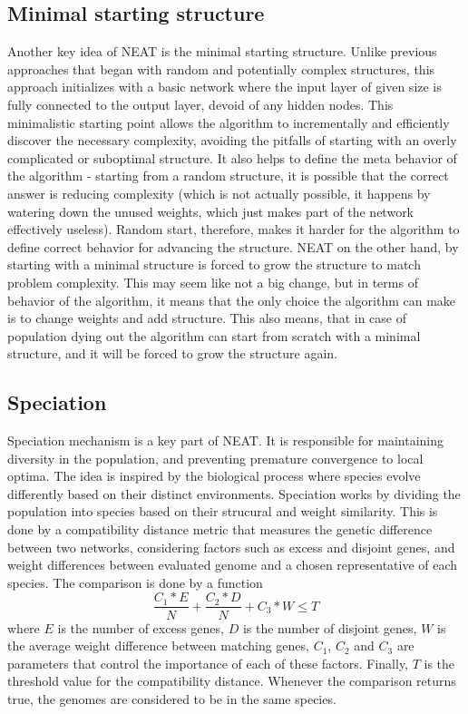 \documentclass{article}
\begin{document}
\subsection{Minimal starting structure}
Another key idea of NEAT is the minimal starting structure. Unlike previous approaches that began with random and potentially complex structures, 
this approach initializes with a basic network where the input layer of given size is fully connected to the output layer, devoid of any hidden nodes.
This minimalistic starting point allows the algorithm to incrementally and efficiently discover the necessary complexity, avoiding the pitfalls of starting
with an overly complicated or suboptimal structure. It also helps to define the meta behavior of the algorithm - starting from a random structure, it is
possible that the correct answer is reducing complexity (which is not actually possible, it happens by watering down the unused weights, which just makes
part of the network effectively useless). Random start, therefore, makes it harder for the algorithm to define correct behavior for advancing the structure.
NEAT on the other hand, by starting with a minimal structure is forced to grow the structure to match problem complexity. This may seem like not a big
change, but in terms of behavior of the algorithm, it means that the only choice the algorithm can make is to change weights and add structure. This also means,
that in case of population dying out the algorithm can start from scratch with a minimal structure, and it will be forced to grow the structure again. 

\subsection{Speciation}
Speciation mechanism is a key part of NEAT.
It is responsible for maintaining diversity in the population, and preventing premature convergence to local optima.
The idea is inspired by the biological process where species evolve differently based on their distinct environments.
Speciation works by dividing the population into species based on their strucural and weight similarity.
This is done by a compatibility distance metric that measures the genetic difference between two networks, 
considering factors such as excess and disjoint genes, and weight differences between evaluated genome and a chosen representative of each species. 
The comparison is done by a function
$$ \frac{C_1*E}  {N} + \frac{C_2*D} {N} + C_3*W \leq T$$
where $E$ is the number of excess genes, $D$ is the number of disjoint genes, $W$ is the average weight difference between matching genes, 
$C_1$, $C_2$ and $C_3$ are parameters that control the importance of each of these factors. Finally, $T$ is the threshold value for the compatibility distance.
Whenever the comparison returns true, the genomes are considered to be in the same species. 
\end{document}
